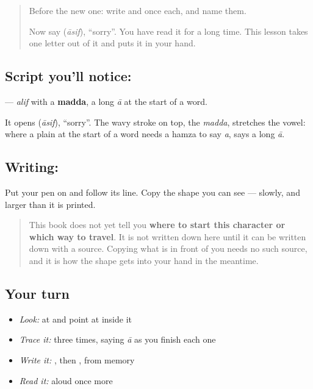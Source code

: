 \label{lesson:AR-W48-alif-madda}



\begin{quote}
Before the new one: write  and  once each, and name them.

Now say \textbf{} (\emph{āsif}), \textquotedblleft{}sorry\textquotedblright{}. You have read it for a long time. This lesson takes one letter out of it and puts it in your hand.
\end{quote}

\subsection*{Script you'll notice: }
\textbf{} — \emph{alif} with a \textbf{madda}, a long \emph{ā} at the start of a word.

It opens \textbf{} (\emph{āsif}), \textquotedblleft{}sorry\textquotedblright{}. The wavy stroke on top, the \emph{madda}, stretches the vowel: where a plain \textbf{} at the start of a word needs a hamza to say \emph{a}, \textbf{} says a long \emph{ā}.

\subsection*{Writing: }
Put your pen on  and follow its line. Copy the shape you can see — slowly, and larger than it is printed.

\begin{quote}
This book does not yet tell you \textbf{where to start this character or which way to travel}. It is not written down here until it can be written down with a source. Copying what is in front of you needs no such source, and it is how the shape gets into your hand in the meantime.
\end{quote}

\subsection*{Your turn}
\begin{itemize}
\raggedright
  \item \emph{Look:} at \textbf{} and point at  inside it
  \item \emph{Trace it:}  three times, saying \emph{ā} as you finish each one
  \item \emph{Write it:} , then , from memory
  \item \emph{Read it:} \textbf{} aloud once more
\end{itemize}


